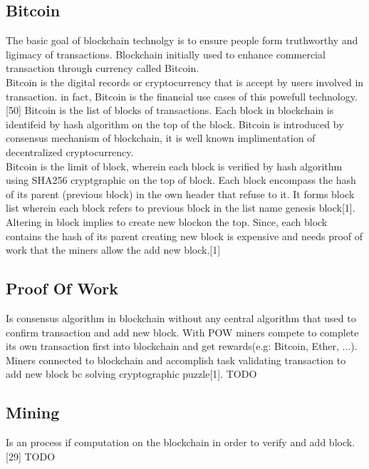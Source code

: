\subsection{Bitcoin} 
The basic goal of blockchain technolgy is to ensure people form truthworthy and ligimacy of transactions. Blockchain initially used to enhance commercial transaction through currency called Bitcoin. \\
Bitcoin is the digital records or cryptocurrency that is accept by users involved in transaction. in fact, Bitcoin is the financial use cases of this powefull technology.[50]
Bitcoin is the list of blocks of transactions. Each block in blockchain is identifeid by hash algorithm on the top of the block.
Bitcoin is introduced by consensus mechanism of blockchain, it is well known implimentation of decentralized cryptocurrency.\\
Bitcoin is the limit of block, wherein each block is verified by hash algorithm using SHA256 cryptgraphic on the top of block. Each block encompass the hash of its parent (previous block) in the own header that refuse to it.
It forms block list wherein each block refers to previous block in the list name  genesis block[1]. Altering in block implies to create new blockon the top. Since, each block contains the hash of its parent creating new block is expensive and  needs proof of work that the miners allow the add new block.[1]

\subsection{Proof Of Work}
Is consensus algorithm in blockchain without any central algorithm that used to confirm transaction and add new block. With POW miners compete to complete its own transaction first into blockchain and get rewards(e.g: Bitcoin, Ether, ...).\\
Miners connected to blockchain and accomplish task validating transaction to add new block bc solving cryptographic puzzle[1].
TODO
\subsection{Mining}
Is an process if computation on the blockchain in order to verify and add block.[29]
TODO

